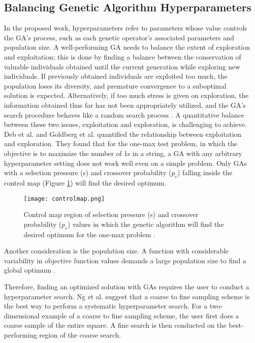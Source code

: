 \subsection{Balancing Genetic Algorithm Hyperparameters}
In the proposed work, hyperparameters refer to parameters whose value controls 
the \gls{GA}'s process, such as each genetic operator's associated parameters 
and population size.  
A well-performing \gls{GA} needs to balance the extent of exploration and 
exploitation; this is done by finding a balance between the conservation of 
valuable individuals obtained until the current generation while exploring new 
individuals. 
If previously obtained individuals are exploited too much, the population loses 
its diversity, and premature convergence to a suboptimal solution is expected. 
Alternatively, if too much stress is given on exploration, the information obtained 
thus far has not been appropriately utilized, and the \gls{GA}'s search procedure 
behaves like a random search process \cite{deb_multi-objective_2001}. 
A quantitative balance between these two issues, exploitation and exploration, 
is challenging to achieve. 
Deb et al. \cite{deb_multi-objective_2001} and Goldberg et al. 
\cite{goldberg_toward_1993} quantified the relationship between exploitation 
and exploration. 
They found that for the one-max test problem, in which the objective is to 
maximize the number of 1s in a string, a \gls{GA} with any arbitrary 
hyperparameter setting does not work well even on a simple problem. 
Only \glspl{GA} with a selection pressure (s) and crossover probability ($p_c$) 
falling inside the control map (Figure \ref{fig:controlmap}) will find the desired 
optimum.  
\begin{figure}[]
    \centering
    \texttt{[image: controlmap.png]} 
    \caption{Control map region of selection pressure (s) and crossover probability ($p_c$)
    values in which the genetic algorithm will find the desired optimum for the 
    one-max problem \cite{goldberg_toward_1993,deb_multi-objective_2001}.}
    \label{fig:controlmap}
\end{figure}
Another consideration is the population size. 
A function with considerable variability in objective function values demands 
a large population size to find a global optimum \cite{deb_multi-objective_2001}. 

Therefore, finding an optimized solution with \glspl{GA} requires the user 
to conduct a hyperparameter search. 
Ng et al. \cite{ng_improving_2021} suggest that a coarse to fine sampling scheme 
is the best way to perform a systematic hyperparameter search.  
For a two-dimensional example of a coarse to fine sampling scheme, the user 
first does a coarse sample of the entire square. 
A fine search is then conducted on the best-performing region of the coarse 
search. 

